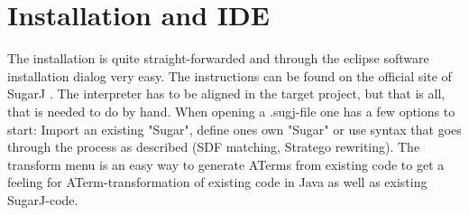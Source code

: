 \documentclass{report}
\begin{document}
\section{Installation and IDE}
The installation is quite straight-forwarded and through the eclipse software installation dialog very easy. The instructions can be found on the official site of SugarJ \cite{SugarJ-Homepage}. The interpreter has to be aligned in the target project, but that is all, that is needed to do by hand. When opening a .sugj-file one has a few options to start: Import an existing "Sugar", define ones own "Sugar" or use syntax that goes through the process as described (SDF matching, Stratego rewriting). The transform menu is an easy way to generate ATerms from existing code to get a feeling for ATerm-transformation of existing code in Java as well as existing SugarJ-code.
\end{document}

